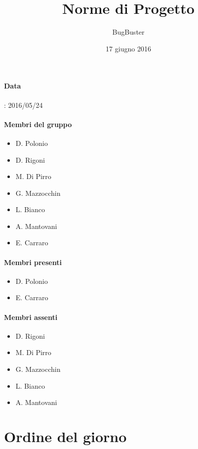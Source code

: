 



\title{\textbf{Norme di Progetto}}
\author{BugBuster}

\date{17 giugno 2016}



\makeFrontPage

\paragraph*{Data}: 2016/05/24

\paragraph*{Membri del gruppo}
\begin{itemize}

\item D. Polonio
\item D. Rigoni
\item M. Di Pirro
\item G. Mazzocchin
\item L. Bianco
\item A. Mantovani
\item E. Carraro
\end{itemize}

\paragraph*{Membri presenti}
\begin{itemize}

\item D. Polonio
\item E. Carraro
\end{itemize}

\paragraph*{Membri assenti}
\begin{itemize}

\item D. Rigoni
\item M. Di Pirro
\item G. Mazzocchin
\item L. Bianco
\item A. Mantovani
\end{itemize}

\section{Ordine del giorno}

